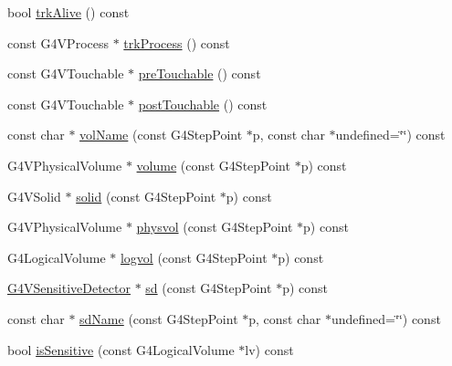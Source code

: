 \begin{DoxyCompactItemize}
\item 
bool \hyperlink{class_d_d4hep_1_1_simulation_1_1_geant4_step_handler_a8960f975f297caa7c6d227e329ec4f95}{trkAlive} () const 
\item 
const G4VProcess $\ast$ \hyperlink{class_d_d4hep_1_1_simulation_1_1_geant4_step_handler_a6935bbfe146b71fd4019a5ec0ea397a3}{trkProcess} () const 
\item 
const G4VTouchable $\ast$ \hyperlink{class_d_d4hep_1_1_simulation_1_1_geant4_step_handler_ae808f346ce65f89c398ea839327b5c2f}{preTouchable} () const 
\item 
const G4VTouchable $\ast$ \hyperlink{class_d_d4hep_1_1_simulation_1_1_geant4_step_handler_a886d0adf0ab8439d86f59505f92d7389}{postTouchable} () const 
\item 
const char $\ast$ \hyperlink{class_d_d4hep_1_1_simulation_1_1_geant4_step_handler_afee3ff3d85321b5bf9a453d7c2ada632}{volName} (const G4StepPoint $\ast$p, const char $\ast$undefined=\char`\"{}\char`\"{}) const 
\item 
G4VPhysicalVolume $\ast$ \hyperlink{class_d_d4hep_1_1_simulation_1_1_geant4_step_handler_a95ee141aadb5e72b9bd204b44ef62f0a}{volume} (const G4StepPoint $\ast$p) const 
\item 
G4VSolid $\ast$ \hyperlink{class_d_d4hep_1_1_simulation_1_1_geant4_step_handler_a8ce2c4056ad81f1d2500abfa819a2198}{solid} (const G4StepPoint $\ast$p) const 
\item 
G4VPhysicalVolume $\ast$ \hyperlink{class_d_d4hep_1_1_simulation_1_1_geant4_step_handler_ab484afdaf7e593c1f2f41e70aaf9cb71}{physvol} (const G4StepPoint $\ast$p) const 
\item 
G4LogicalVolume $\ast$ \hyperlink{class_d_d4hep_1_1_simulation_1_1_geant4_step_handler_a60c5a97f61fc6aa52224c474632aed47}{logvol} (const G4StepPoint $\ast$p) const 
\item 
\hyperlink{class_g4_v_sensitive_detector}{G4VSensitiveDetector} $\ast$ \hyperlink{class_d_d4hep_1_1_simulation_1_1_geant4_step_handler_a6b7355a5af216dddcf41af1c1d9e2b8d}{sd} (const G4StepPoint $\ast$p) const 
\item 
const char $\ast$ \hyperlink{class_d_d4hep_1_1_simulation_1_1_geant4_step_handler_a0bf72f4bb74c03b2489ab9c9b79e7a30}{sdName} (const G4StepPoint $\ast$p, const char $\ast$undefined=\char`\"{}\char`\"{}) const 
\item 
bool \hyperlink{class_d_d4hep_1_1_simulation_1_1_geant4_step_handler_a180c0a67f1cc88eba63fbbcb4fe6f47d}{isSensitive} (const G4LogicalVolume $\ast$lv) const 
\item 

\end{DoxyCompactItemize}
